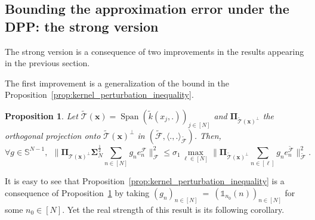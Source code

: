 \documentclass[twoside,11pt]{book}
\newtheorem{proposition}{Proposition}
\DeclareMathOperator{\Span}{\mathrm{Span}}
\newcommand{\pc}[1]{\textcolor{blue}{#1}}
\begin{document}

\subsection{Bounding the approximation error under the DPP: the strong version}
The strong version is a consequence of two improvements in the results appearing in the previous section.

The first improvement is a generalization of the bound in the Proposition~\ref{prop:kernel_perturbation_inequality}. 

\begin{proposition}\label{prop:strong_kernel_perturbation_inequality}
Let $ \tilde{\mathcal{T}}(\bm{x}) = \Span \left( \tilde{k}(x_{j},.) \right)_{j \in [N]}$ and $\bm{\Pi}_{\tilde{\mathcal{T}}(\bm{x})^{\perp}}$ the orthogonal projection onto $\tilde{\mathcal{T}}(\bm{x})^{\perp}$ in $(\tilde{\mathcal{F}}, \langle .,.\rangle_{\tilde{\mathcal{F}}})$. Then,
\begin{equation}\label{eq:kernel_perturbation_inequality_generalization}
    \forall g \in \mathbb{S}^{N-1}, \:\: \|\bm{\Pi}_{\mathcal{T}(\bm{x})^{\perp}} \bm{\Sigma}_{N}^{\frac{1}{2}} \sum\limits_{n \in [N]}g_{n} e_{n}^{\mathcal{F}}\|_{\mathcal{F}}^{2} \leq \sigma_{1} \max\limits_{\ell \in [N]}   \|\bm{\Pi}_{\tilde{\mathcal{T}}(\bm{x})^{\perp}} \sum\limits_{n \in [\ell]}g_{n} e_{n}^{\tilde{\mathcal{F}}}\|_{\tilde{\mathcal{F}}}^{2}.
\end{equation}
\end{proposition}

It is easy to see that Proposition~\ref{prop:kernel_perturbation_inequality} is a consequence of Proposition~\ref{prop:strong_kernel_perturbation_inequality} by taking $(g_{n})_{n \in [N]}~=~(\mathbb{1}_{n_{0}}(n))_{n \in [N]}$ for some $n_{0} \in [N]$. Yet the real strength of this result is its following corollary.
\end{document}
